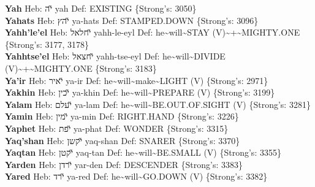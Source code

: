 {\textbf{Yah} Heb: {\large\H יה} yah Def: EXISTING \{Strong's: 3050\}\hfill{}\\

\textbf{Yahats} Heb: {\large\H יהץ} ya-hats Def: STAMPED.DOWN \{Strong's: 3096\}\hfill{}\\

\textbf{Yahh'le'el} Heb: {\large\H יחלאל} yahh-le-eyl Def: he\textasciitilde{}will\textasciitilde{}STAY (V)\textasciitilde{}+\textasciitilde{}MIGHTY.ONE \{Strong's: 3177, 3178\}\hfill{}\\

\textbf{Yahhtse'el} Heb: {\large\H יחצאל} yahh-tse-eyl Def: he\textasciitilde{}will\textasciitilde{}DIVIDE (V)\textasciitilde{}+\textasciitilde{}MIGHTY.ONE \{Strong's: 3183\}\hfill{}\\

\textbf{Ya'ir} Heb: {\large\H יאיר} ya-ir Def: he\textasciitilde{}will\textasciitilde{}make\textasciitilde{}LIGHT (V) \{Strong's: 2971\}\hfill{}\\

\textbf{Yakhin} Heb: {\large\H יכין} ya-khin Def: he\textasciitilde{}will\textasciitilde{}PREPARE (V) \{Strong's: 3199\}\hfill{}\\

\textbf{Yalam} Heb: {\large\H יעלם} ya-lam Def: he\textasciitilde{}will\textasciitilde{}BE.OUT.OF.SIGHT (V) \{Strong's: 3281\}\hfill{}\\

\textbf{Yamin} Heb: {\large\H ימין} ya-min Def: RIGHT.HAND \{Strong's: 3226\}\hfill{}\\

\textbf{Yaphet} Heb: {\large\H יפת} ya-phat Def: WONDER \{Strong's: 3315\}\hfill{}\\

\textbf{Yaq'shan} Heb: {\large\H יקשן} yaq-shan Def: SNARER \{Strong's: 3370\}\hfill{}\\

\textbf{Yaqtan} Heb: {\large\H יקטן} yaq-tan Def: he\textasciitilde{}will\textasciitilde{}BE.SMALL (V) \{Strong's: 3355\}\hfill{}\\

\textbf{Yarden} Heb: {\large\H ירדן} yar-den Def: DESCENDER \{Strong's: 3383\}\hfill{}\\

\textbf{Yared} Heb: {\large\H ירד} ya-red Def: he\textasciitilde{}will\textasciitilde{}GO.DOWN (V) \{Strong's: 3382\}\hfill{}\\

}
